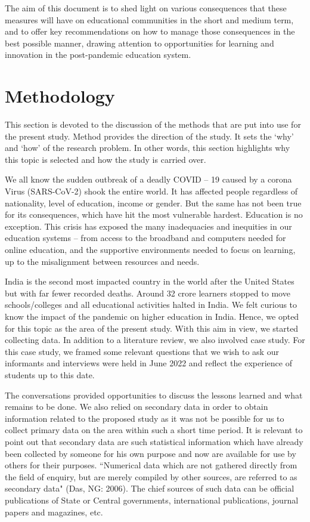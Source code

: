 \documentclass[11pt]{scrartcl}
\begin{document}
	The aim of this document is to shed light on various consequences that these measures will have on educational communities in the short and medium term, and to offer key recommendations on how to manage those consequences in the best possible manner, drawing attention to opportunities for learning and innovation in the post-pandemic education system.
	
	\pagebreak
	
	\section{Methodology}
	
	This section is devoted to the discussion of the methods that are put into use for the present study. Method provides the direction of the study. It sets the ‘why’ and ‘how’ of the research problem. In other words, this section highlights why this topic is selected and how the study is carried over. 
	
	We all know the sudden outbreak of a deadly COVID – 19 caused by a corona Virus (SARS-CoV-2) shook the entire world. It has affected people regardless of nationality, level of education, income or gender. But the same has not been true for its consequences, which have hit the most vulnerable hardest. Education is no exception. This crisis has exposed the many inadequacies and inequities in our education systems – from access to the broadband and computers needed for online education, and the supportive environments needed to focus on learning, up to the misalignment between resources and needs. 
	
	India is the second most impacted country in the world after the United States but with far fewer recorded deaths. Around 32 crore learners stopped to move schools/colleges and all educational activities halted in India. We felt curious to know the impact of the pandemic on higher education in India. Hence, we opted for this topic as the area of the present study. With this aim in view, we started collecting data. In addition to a literature review, we also involved case study. For this case study, we framed some relevant questions that we wish to ask our informants and interviews were held in June 2022 and reflect the experience of students up to this date. 
	
	The conversations provided opportunities to discuss the lessons learned and what remains to be done. We also relied on secondary data in order to obtain information related to the proposed study as it was not be possible for us to collect primary data on the area within such a short time period. It is relevant to point out that secondary data are such statistical information which have already been collected by someone for his own purpose and now are available for use by others for their purposes. ``Numerical data which are not gathered directly from the field of enquiry, but are merely compiled by other sources, are referred to as secondary data" (Das, NG: 2006). The chief sources of such data can be official publications of State or Central governments, international publications, journal papers and magazines, etc. 
	
\end{document}
